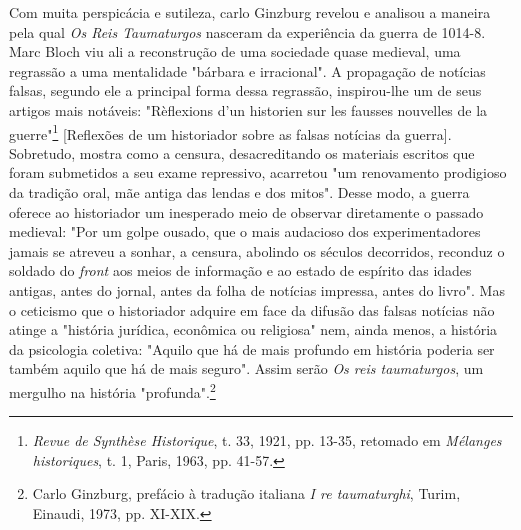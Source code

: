 \documentclass[a5paper]{book}
\begin{document}
Com muita perspicácia e sutileza, carlo Ginzburg revelou e analisou a maneira pela qual \textit{Os Reis Taumaturgos} nasceram da experiência da guerra de 1014-8. Marc Bloch viu ali a reconstrução de uma sociedade quase medieval, uma regrassão a uma mentalidade "bárbara e irracional". A propagação de notícias falsas, segundo ele a principal forma dessa regrassão, inspirou-lhe um de seus artigos mais notáveis: "Rèflexions d'un historien sur les fausses nouvelles de la guerre"\footnote{\textit{Revue de Synthèse Historique}, t. 33, 1921, pp. 13-35, retomado em \textit{Mélanges historiques}, t. 1, Paris, 1963, pp. 41-57.} [Reflexões de um historiador sobre as falsas notícias da guerra]. Sobretudo, mostra como a censura, desacreditando os materiais escritos que foram submetidos a seu exame repressivo, acarretou "um renovamento prodigioso da tradição oral, mãe antiga das lendas e dos mitos". Desse modo, a guerra oferece ao historiador um inesperado meio de observar diretamente o passado medieval: "Por um golpe ousado, que o mais audacioso dos experimentadores jamais se atreveu a sonhar, a censura, abolindo os séculos decorridos, reconduz o soldado do \textit{front} aos meios de informação e ao estado de espírito das idades antigas, antes do jornal, antes da folha de notícias impressa, antes do livro". Mas o ceticismo que o historiador adquire em face da difusão das falsas notícias não atinge a "história jurídica, econômica ou religiosa" nem, ainda menos, a história da psicologia coletiva: "Aquilo que há de mais profundo em história poderia ser também aquilo que há de mais seguro". Assim serão \textit{Os reis taumaturgos}, um mergulho na história "profunda".\footnote{Carlo Ginzburg, prefácio à tradução italiana \textit{I re taumaturghi}, Turim, Einaudi, 1973, pp. XI-XIX.}
\end{document}
